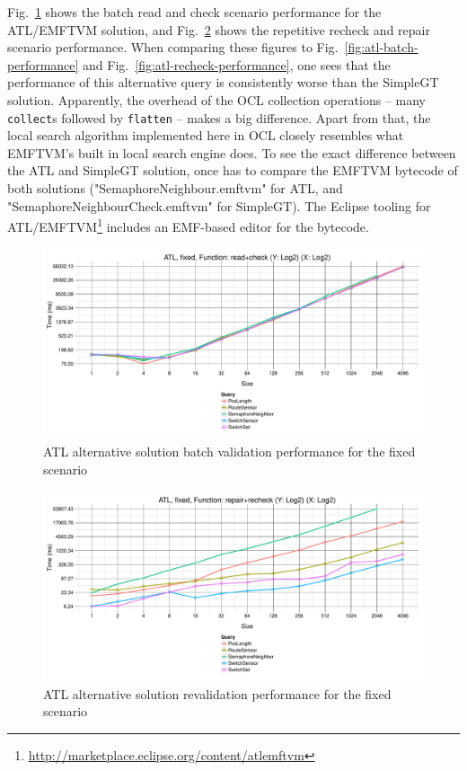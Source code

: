 \documentclass[submission,copyright,creativecommons]{eptcs}
\begin{document}
Fig.~\ref{fig:atl-batch-performance-alt} shows the batch read and check scenario performance for the ATL/EMFTVM solution, and Fig.~\ref{fig:atl-recheck-performance-alt} shows the repetitive recheck and repair scenario performance. When comparing these figures to Fig.~\ref{fig:atl-batch-performance} and Fig.~\ref{fig:atl-recheck-performance}, one sees that the performance of this alternative query is consistently worse than the SimpleGT solution. Apparently, the overhead of the OCL collection operations -- many \texttt{collect}s followed by \texttt{flatten} -- makes a big difference. Apart from that, the local search algorithm implemented here in OCL closely resembles what EMFTVM's built in local search engine does. To see the exact difference between the ATL and SimpleGT solution, once has to compare the EMFTVM bytecode of both solutions ("SemaphoreNeighbour.emftvm" for ATL, and "SemaphoreNeighbourCheck.emftvm" for SimpleGT). The Eclipse tooling for ATL/EMFTVM\footnote{\url{http://marketplace.eclipse.org/content/atlemftvm}} includes an EMF-based editor for the bytecode.

\begin{figure}[ht]
\centerline{
\includegraphics[width=15cm]{figures/fixed-ATL-GroupBy-Query-time-batch-validation-alt}}
\caption{ATL alternative solution batch validation performance for the fixed scenario}
\label{fig:atl-batch-performance-alt}
\end{figure}

\begin{figure}[ht]
\centerline{
\includegraphics[width=15cm]{figures/fixed-ATL-GroupBy-Query-time-revalidation-alt}}
\caption{ATL alternative solution revalidation performance for the fixed scenario}
\label{fig:atl-recheck-performance-alt}
\end{figure}




\end{document}

